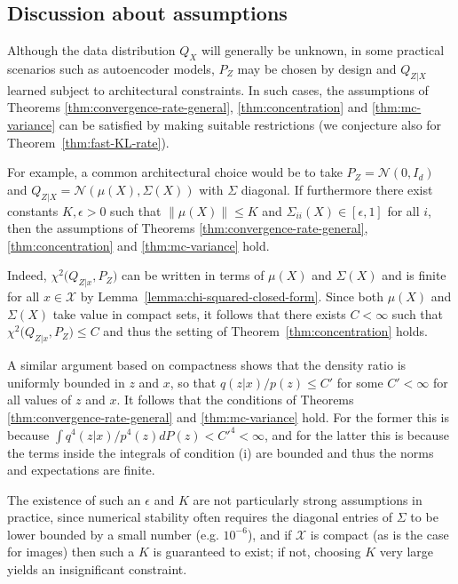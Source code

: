 \subsection{Discussion about assumptions}

Although the data distribution $Q_X$ will generally be unknown, in some practical scenarios such as autoencoder models, $P_Z$ may be chosen by design and $Q_{Z|X}$ learned subject to architectural constraints.
In such cases, the assumptions of Theorems \ref{thm:convergence-rate-general}, \ref{thm:concentration} and \ref{thm:mc-variance} can be satisfied by making suitable restrictions (we conjecture also for Theorem~\ref{thm:fast-KL-rate}).

For example, a common architectural choice would be to take ${P_Z}={\mathcal{N}\left(0, I_d\right)}$ and ${Q_{Z|X}}={\mathcal{N}\left( \mu(X), \Sigma(X)\right)}$ with $\Sigma$ diagonal. 
If furthermore there exist constants $K, \epsilon > 0$ such that ${\| \mu(X)\| \leq K}$ and ${\Sigma_{ii}(X) \in [\epsilon, 1]}$ for all $i$, then the assumptions of Theorems \ref{thm:convergence-rate-general}, \ref{thm:concentration} and \ref{thm:mc-variance} hold.

Indeed, $\chi^2\bigl( Q_{Z|x}, P_Z\bigr)$ can be written in terms of $\mu(X)$ and $\Sigma(X)$ and is finite for all $x\in\mathcal{X}$ by Lemma~\ref{lemma:chi-squared-closed-form}.
Since both $\mu(X)$ and $\Sigma(X)$ take value in compact sets, it follows that there exists $C<\infty$ such that $\chi^2\bigl( Q_{Z|x}, P_Z\bigr) \leq C$ and thus the setting of Theorem~\ref{thm:concentration} holds.

A similar argument based on compactness shows that the density ratio is uniformly bounded in $z$ and $x$, so that $q(z|x)/p(z) \leq C'$ for some $C'<\infty$ for all values of $z$ and $x$. 
It follows that the conditions of Theorems \ref{thm:convergence-rate-general} and \ref{thm:mc-variance} hold.
For the former this is because $\int q^4(z|x)/p^4(z) dP(z) < {C'}^4 < \infty$, and for the latter this is because the terms inside the integrals of condition (i) are bounded and thus the norms and expectations are finite. 


The existence of such an $\epsilon$ and $K$ are not particularly strong assumptions in practice, since
numerical stability often requires the diagonal entries of $\Sigma$ to be lower bounded by a small number (e.g. $10^{-6}$), and
if $\mathcal{X}$ is compact (as is the case for images) then such a $K$ is guaranteed to exist; if not, choosing $K$ very large yields an insignificant constraint.


